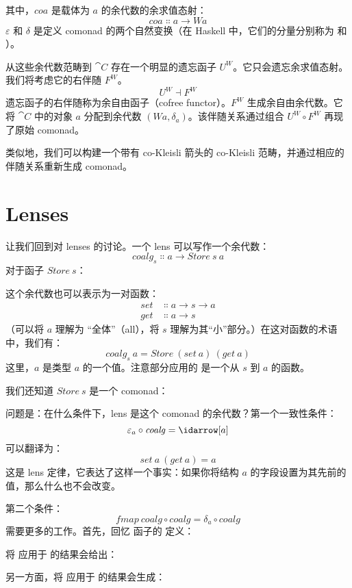 \noindent
其中，$\mathit{coa}$ 是载体为 $a$ 的余代数的余求值态射：
\[\mathit{coa} \Colon a \to W a\]
$\varepsilon$ 和 $\delta$ 是定义 comonad 的两个自然变换（在 Haskell 中，它们的分量分别称为  和 ）。

从这些余代数范畴到 $\cat{C}$ 存在一个明显的遗忘函子 $U^W$。它只会遗忘余求值态射。我们将考虑它的右伴随 $F^W$。
\[U^W \dashv F^W\]
遗忘函子的右伴随称为余自由函子（cofree functor）。$F^W$ 生成余自由余代数。它将 $\cat{C}$ 中的对象 $a$ 分配到余代数 $(W a, \delta_a)$。该伴随关系通过组合 $U^W \circ F^W$ 再现了原始 comonad。

类似地，我们可以构建一个带有 co-Kleisli 箭头的 co-Kleisli 范畴，并通过相应的伴随关系重新生成 comonad。

\section{Lenses}

让我们回到对 lenses 的讨论。一个 lens 可以写作一个余代数：
\[\mathit{coalg}_s \Colon a \to \mathit{Store}\ s\ a\]
对于函子 $\mathit{Store}\ s$：

这个余代数也可以表示为一对函数：
\begin{align*}
  \mathit{set} & \Colon a \to s \to a \\
  \mathit{get} & \Colon a \to s
\end{align*}
（可以将 $a$ 理解为 “全体”（all），将 $s$ 理解为其“小”部分。）在这对函数的术语中，我们有：
\[\mathit{coalg}_s\ a = \mathit{Store}\ (\mathit{set}\ a)\ (\mathit{get}\ a)\]
这里，$a$ 是类型 $a$ 的一个值。注意部分应用的  是一个从 $s$ 到 $a$ 的函数。

我们还知道 $\mathit{Store}\ s$ 是一个 comonad：

问题是：在什么条件下，lens 是这个 comonad 的余代数？第一个一致性条件：
\[\varepsilon_a \circ \mathit{coalg} = \idarrow[a]\]
可以翻译为：
\[\mathit{set}\ a\ (\mathit{get}\ a) = a\]
这是 lens 定律，它表达了这样一个事实：如果你将结构 $a$ 的字段设置为其先前的值，那么什么也不会改变。

第二个条件：
\[\mathit{fmap}\ \mathit{coalg} \circ \mathit{coalg} = \delta_a \circ \mathit{coalg}\]
需要更多的工作。首先，回忆  函子的  定义：

将  应用于  的结果会给出：

另一方面，将  应用于  的结果会生成：

